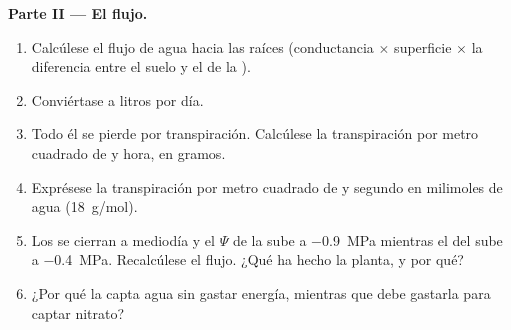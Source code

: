 \begin{problem}
\medskip
\noindent\textbf{Parte II --- El flujo.}
\begin{enumerate}[resume]
  \item Calcúlese el flujo de agua hacia las raíces (conductancia $\times$
        superficie $\times$ la diferencia entre el suelo y el  de la
        ).
  \item Conviértase a litros por día.
  \item Todo él se pierde por transpiración. Calcúlese la transpiración por
        metro cuadrado de  y hora, en gramos.
  \item Exprésese la transpiración por metro cuadrado de  y segundo en
        milimoles de agua (\qty{18}{g/mol}).
  \item Los  se cierran a mediodía y el $\Psi$ de la  sube a
        \qty{-0.9}{MPa} mientras el del  sube a \qty{-0.4}{MPa}.
        Recalcúlese el flujo. ¿Qué ha hecho la planta, y por qué?
  \item ¿Por qué la  capta agua sin gastar energía, mientras que debe
        gastarla para captar nitrato?
\end{enumerate}


\end{problem}
